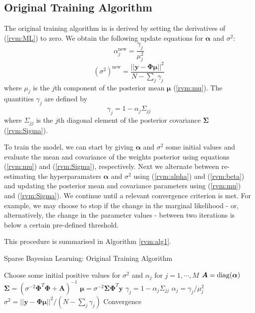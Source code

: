 \subsection{Original Training Algorithm}
\label{sect:rvm_orig}
The original training algorithm in \cite{tipping2001} is derived by setting the derivatives of (\ref{rvm:ML}) to zero.
We obtain the following update equations for $\bm\alpha$ and $\sigma^2$:
\begin{equation}
  \label{rvm:alpha}
  \alpha_j^{\mbox{new}} = \frac{\gamma_j}{\mu_j^2}
\end{equation}
\begin{equation}
  \label{rvm:beta}
  (\sigma^2)^{\mbox{new}} = \frac{||\bm y - \bm\Phi\bm\mu||^2}{N - \sum_j\gamma_j}
\end{equation}
where $\mu_j$ is the $j$th component of the posterior mean $\bm\mu$ (\ref{rvm:mu}).
The quantities $\gamma_j$ are defined by 
\begin{equation*}
  \gamma_j = 1 - \alpha_j \Sigma_{jj}
\end{equation*}
where $\Sigma_{jj}$ is the $j$th diagonal element of the posterior covariance $\bm\Sigma$ (\ref{rvm:Sigma}).

To train the model, we can start by giving $\bm\alpha$ and $\sigma^2$ some initial values and evaluate the mean and covariance of the weights posterior using equations (\ref{rvm:mu}) and (\ref{rvm:Sigma}), respectively.
Next we alternate between re-estimating the hyperparamaters $\bm\alpha$ and $\sigma^2$ using (\ref{rvm:alpha}) and (\ref{rvm:beta}) and updating the posterior mean and covariance parameters using (\ref{rvm:mu}) and (\ref{rvm:Sigma}).
We continue until a relevant convergence criterion is met.
For example, we may choose to stop if the change in the marginal likelihood - or, alternatively, the change in the parameter values - between two iterations is below a certain pre-defined threshold.

This procedure is summarised in Algorithm \ref{rvm:alg1}.
\begin{algorithm}
  \caption{Sparse Bayesian Learning: Original Training Algorithm}
  \label{rvm:alg1}
  \begin{algorithmic}[1]
    \State Choose some initial positive values for $\sigma^2$ and $\alpha_j$ for $j=1,\cdots,M$ 
    \Repeat
    \State $\bm A = \operatorname*{diag}(\bm\alpha)$
    \State $\bm\Sigma = \left(\sigma^{-2}\bm\Phi^T\bm\Phi + \bm A\right)^{-1}$
    \State $\bm\mu = \sigma^{-2}\bm\Sigma\bm\Phi^T\bm y$
    \Statex
    \State $\gamma_j = 1 - \alpha_j \Sigma_{jj}$
    \State $\alpha_j = \gamma_j/\mu_j^2$
    \EndFor
    \State $\sigma^2 =||\bm y - \bm\Phi\bm\mu||^2 / (N - \sum_j\gamma_j)$
    \Until Convergence
  \end{algorithmic}
\end{algorithm}

